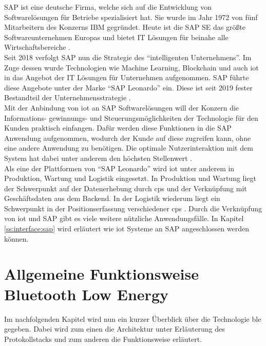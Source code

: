 \noindent SAP ist eine deutsche Firma, welche sich auf die Entwicklung von Softwarelösungen für Betriebe spezialisiert hat. Sie wurde im Jahr 1972 von fünf Mitarbeitern des Konzerns IBM gegründet. Heute ist die SAP SE das größte Softwareunternehmen Europas und bietet IT Lösungen für beinahe alle Wirtschaftsbereiche \cite{SAP20:WWW}.\\
\noindent Seit 2018 verfolgt SAP nun die Strategie des "`intelligenten Unternehmens"'. Im Zuge dessen wurde Technologien wie Machine Learning, Blockchain und auch \ac{iot} in das Angebot der IT Lösungen für Unternehmen aufgenommen. SAP führte diese Angebote unter der Marke "`SAP Leonardo"' ein. Diese ist seit 2019 fester Bestandteil der Unternehmensstrategie \cite[Seite 102f]{Holtschulte20:IOS}.\\ 
\noindent Mit der Anbindung von \ac{iot} an SAP Softwarelösungen will der Konzern die Informations- gewinnungs- und Steuerungsmöglichkeiten der Technologie für den Kunden praktisch einfangen. Dafür werden diese Funktionen in die SAP Anwendung aufgenommen, wodurch der Kunde auf diese zugreifen kann, ohne eine andere Anwendung zu benötigen. Die optimale Nutzerinteraktion mit dem System hat dabei unter anderem den höchsten Stellenwert \cite[Seite 105f]{Holtschulte20:IOS}.\\
\noindent Als eine der Plattformen von "`SAP Leonardo"' wird \ac{iot} unter anderem in Produktion, Wartung und Logistik eingesetzt. In Produktion und Wartung liegt der Schwerpunkt auf der Datenerhebung durch \ac{cps} und der Verknüpfung mit Geschäftsdaten aus dem Backend. In der Logistik wiederum liegt ein Schwerpunkt in der Positionserfassung verschiedener \ac{cps} \cite[Seite 107ff]{Holtschulte20:IOS}. Durch die Verknüpfung von \ac{iot} und SAP gibt es viele weitere nützliche Anwendungsfälle. In Kapitel \ref{ss:interface:sap} wird erläutert wie \ac{iot} Systeme an SAP angeschlossen werden können.\\

\section{Allgemeine Funktionsweise Bluetooth Low Energy}
\label{s:funktionsweise}

\noindent Im nachfolgenden Kapitel wird nun ein kurzer Überblick über die Technologie \ac{ble} gegeben. Dabei wird zum einen die Architektur unter Erläuterung des Protokollstacks und zum anderen die Funktionsweise erläutert.\\   

